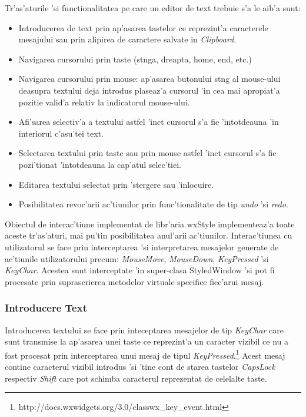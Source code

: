 \medskip

Tr'as'aturile 'si functionalitatea pe care un editor de text trebuie s'a le aib'a sunt:

\begin{itemize}
\item Introducerea de text prin ap'asarea tastelor ce reprezint'a caracterele mesajului sau prin alipirea de caractere salvate in \emph{Clipboard}.
\item Navigarea cursorului prin taste (st{\ia}nga, dreapta, home, end, etc.)
\item Navigarea cursorului prin mouse: ap'asarea butonului st{\ia}ng al mouse-ului deasupra textului deja introdus plaseaz'a cursorul 'in cea mai apropiat'a pozitie valid'a relativ la indicatorul mouse-ului.
\item Afi'sarea selectiv'a a textului astfel 'inc{\ia}t cursorul s'a fie 'intotdeauna 'in interiorul c'asu'tei text.
\item Selectarea textului prin taste sau prin mouse astfel 'inc{\ia}t cursorul s'a fie pozi'tionat 'intotdeauna la cap'atul selec'tiei.
\item Editarea textului selectat prin 'stergere sau 'inlocuire.
\item Posibilitatea revoc'arii ac'tiunilor prin func'tionalitate de tip \emph{undo} 'si \emph{redo}.
\end{itemize}

\medskip

Obiectul de interac'tiune implementat de libr'aria wxStyle implementeaz'a toate aceste tr'as'aturi, mai pu'tin posibilitatea anul'arii ac'tiunilor. Interac'tiunea cu utilizatorul se face prin interceptarea 'si interpretarea mesajelor generate de ac'tiunile utilizatorului precum: \emph{MouseMove}, \emph{MouseDown}, \emph{KeyPressed} 'si \emph{KeyChar}. Acestea sunt interceptate 'in super-clasa StyledWindow 'si pot fi procesate prin suprascrierea metodelor virtuale specifice fiec'arui mesaj.

\subsubsection{Introducere Text}

Introducerea textului se face prin inteceptarea mesajelor de tip \emph{KeyChar} care sunt transmise la ap'asarea unei taste ce reprezint'a un caracter vizibil ce nu a fost procesat prin interceptarea unui mesaj de tipul \emph{KeyPressed}.\footnote{http://docs.wxwidgets.org/3.0/classwx\_key\_event.html} Acest mesaj contine caracterul vizibil introdus 'si 'tine cont de starea tastelor \emph{CapsLock} respectiv \emph{Shift} care pot schimba caracterul reprezentat de celelalte taste.

